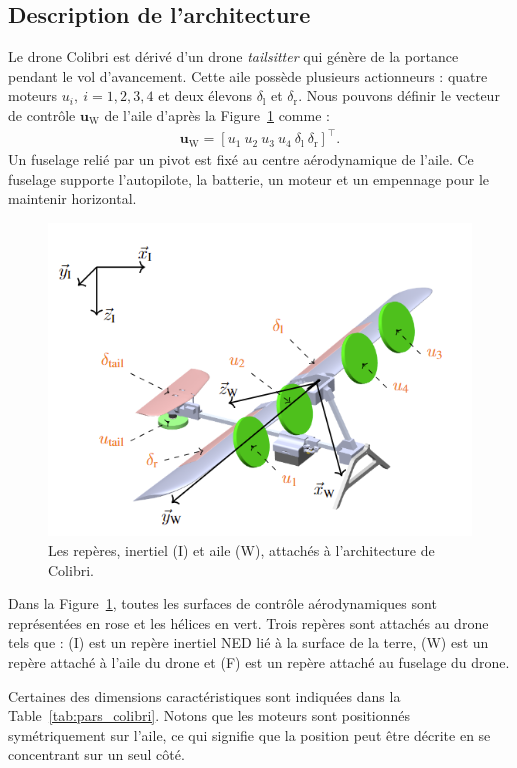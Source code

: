\subsection{Description de l'architecture}
Le drone Colibri est dérivé d'un drone \textit{tailsitter} qui génère de la portance pendant le vol d'avancement. Cette aile possède plusieurs actionneurs : quatre moteurs $u_{i}, ~i = 1,2,3,4$ et deux élevons $\delta_{\text{l}}$ et $\delta_{\text{r}}$. Nous pouvons définir le vecteur de contrôle $\boldsymbol{u}_{\text{W}}$ de l'aile d'après la Figure~\ref{fig:world_body} comme :
\begin{align}
    \label{eq:uw}
    \boldsymbol{u}_{\text{W}} = [u_{1}~u_{2}~u_{3}~u_{4}~\delta_{\text{l}}~\delta_{\text{r}}]^\top.
\end{align} Un fuselage relié par un pivot est fixé au centre aérodynamique de l'aile. Ce fuselage supporte l'autopilote, la batterie, un moteur et un empennage pour le maintenir horizontal.

\begin{figure}[ht!]
    \centering
        \includegraphics[width=0.6\columnwidth,angle=0,trim={0 0.2cm 0 0.5cm},clip]{figures/wold_body.png}
        \caption{Les repères, inertiel (I) et aile (W), attachés à l'architecture de Colibri.}
        \label{fig:world_body}
\end{figure}

    
Dans la Figure~\ref{fig:world_body}, toutes les surfaces de contrôle aérodynamiques sont représentées en rose et les hélices en vert. Trois repères sont attachés au drone tels que : (I) est un repère inertiel NED lié à la surface de la terre, (W) est un repère attaché à l'aile du drone et (F) est un repère attaché au fuselage du drone.


Certaines des dimensions caractéristiques sont indiquées dans la Table~\ref{tab:pars_colibri}. Notons que les moteurs sont positionnés symétriquement sur l'aile, ce qui signifie que la position peut être décrite en se concentrant sur un seul côté. 

